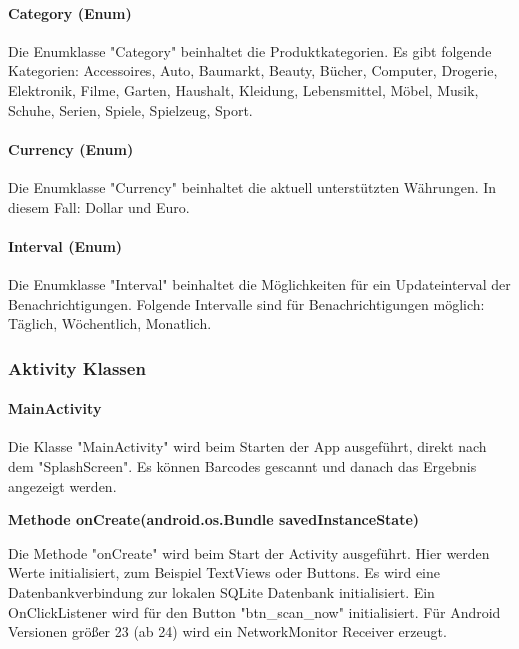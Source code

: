 \documentclass{scrartcl}
\begin{document}
\paragraph{Category (Enum)}

Die Enumklasse "Category" beinhaltet die Produktkategorien. Es gibt folgende Kategorien: Accessoires, Auto, Baumarkt, Beauty, Bücher, Computer, Drogerie, Elektronik, Filme, Garten, Haushalt, Kleidung, Lebensmittel, Möbel, Musik, Schuhe, Serien, Spiele, Spielzeug, Sport.

\paragraph{Currency (Enum)}

Die Enumklasse "Currency" beinhaltet die aktuell unterstützten Währungen. In diesem Fall: Dollar und Euro.

\paragraph{Interval (Enum)}

Die Enumklasse "Interval" beinhaltet die Möglichkeiten für ein Updateinterval der Benachrichtigungen. Folgende Intervalle sind für Benachrichtigungen möglich: Täglich, Wöchentlich, Monatlich.

\newpage

\subsubsection{Aktivity Klassen}

\paragraph{MainActivity}

\noindent Die Klasse "MainActivity" wird beim Starten der App ausgeführt, direkt nach dem "SplashScreen". Es können Barcodes gescannt und danach das Ergebnis angezeigt werden.\newline

\noindent\textbf{Methode onCreate(android.os.Bundle savedInstanceState)}

\noindent Die Methode "onCreate" wird beim Start der Activity ausgeführt. Hier werden Werte initialisiert, zum Beispiel TextViews oder Buttons. Es wird eine Datenbankverbindung zur lokalen SQLite Datenbank initialisiert. Ein OnClickListener wird für den Button "btn\_scan\_now" initialisiert. Für Android Versionen größer 23 (ab 24) wird ein NetworkMonitor Receiver erzeugt.\newline
\end{document}
